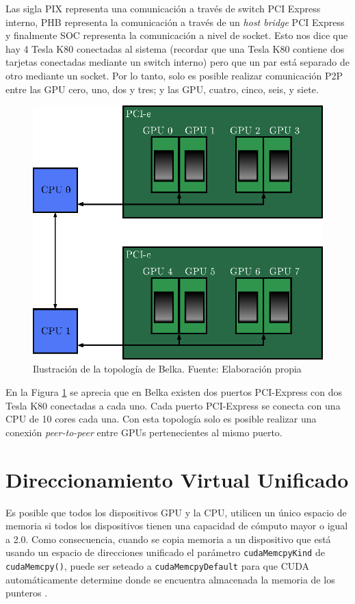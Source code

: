 Las sigla PIX representa una comunicación a través de switch PCI Express interno, PHB representa la comunicación a través de un \textit{host bridge} PCI Express y finalmente SOC representa la comunicación a nivel de socket. Esto nos dice que hay 4 Tesla K80 conectadas al sistema (recordar que una Tesla K80 contiene dos tarjetas conectadas mediante un switch interno) pero que un par está separado de otro mediante un socket. Por lo tanto, solo es posible realizar comunicación P2P entre las GPU cero, uno, dos y tres; y las GPU, cuatro, cinco, seis, y siete.

\begin{figure}[h!]
	\centering
	\includegraphics[scale=0.8]{./images/p2p.eps}
	\caption{Ilustración de la topología de Belka. Fuente: Elaboración propia}
	\label{fig:belkap2p}
\end{figure}

En la Figura \ref{fig:belkap2p} se aprecia que en Belka existen dos puertos PCI-Express con dos Tesla K80 conectadas a cada uno. Cada puerto PCI-Express se conecta con una CPU de 10 cores cada una. Con esta topología solo es posible realizar una conexión \textit{peer-to-peer} entre GPUs pertenecientes al mismo puerto.

\section{Direccionamiento Virtual Unificado}

Es posible que todos los dispositivos GPU y la CPU, utilicen un único espacio de memoria si todos los dispositivos tienen una capacidad de cómputo mayor o igual a 2.0. Como consecuencia, cuando se copia memoria a un dispositivo que está usando un espacio de direcciones unificado el parámetro \texttt{cudaMemcpyKind} de \texttt{cudaMemcpy()}, puede ser seteado a \texttt{cudaMemcpyDefault} para que CUDA automáticamente determine donde se encuentra almacenada la memoria de los punteros \citep{cuda}.

